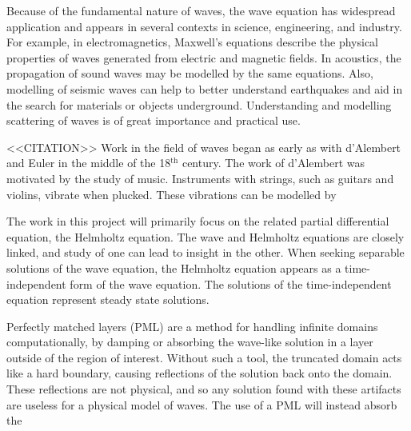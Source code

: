 
Because of the fundamental nature of waves, the wave equation has widespread application and appears in several contexts in science, engineering, and industry.
For example, in electromagnetics, Maxwell's equations describe the physical properties of waves generated from electric and magnetic fields.
In acoustics, the propagation of sound waves may be modelled by the same equations.
Also, modelling of seismic waves can help to better understand earthquakes and aid in the search for materials or objects underground.
Understanding and modelling scattering of waves is of great importance and practical use.

<<CITATION>>
Work in the field of waves began as early as with d'Alembert and Euler in the middle of the 18$^\text{th}$ century.
The work of d'Alembert was motivated by the study of music.
Instruments with strings, such as guitars and violins, vibrate when plucked.
These vibrations can be modelled by 



The work in this project will primarily focus on the related partial differential equation, the Helmholtz equation.
The wave and Helmholtz equations are closely linked, and study of one can lead to insight in the other.
When seeking separable solutions of the wave equation, the Helmholtz equation appears as a time-independent form of the wave equation.
The solutions of the time-independent equation represent steady state solutions.






Perfectly matched layers (PML) are a method for handling infinite domains computationally, by damping or absorbing the wave-like solution in a layer outside of the region of interest.
Without such a tool, the truncated domain acts like a hard boundary, causing reflections of the solution back onto the domain.
These reflections are not physical, and so any solution found with these artifacts are useless for a physical model of waves.
The use of a PML will instead absorb the 




